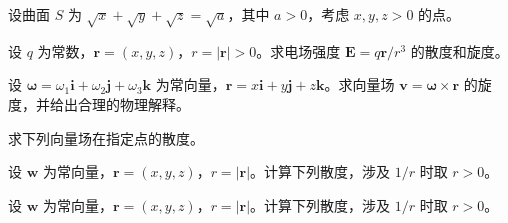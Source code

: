 \noindent\begin{minipage}{\textwidth}
设曲面 $S$ 为 $\sqrt x+\sqrt y+\sqrt z=\sqrt a$，其中 $a>0$，考虑 $x,y,z>0$ 的点。
\end{minipage}\par\vfill
\noindent\begin{minipage}{\textwidth}
设 $q$ 为常数，$\boldsymbol r=(x,y,z)$，$r=|\boldsymbol r|>0$。求电场强度 $\boldsymbol E=q\boldsymbol r/r^3$ 的散度和旋度。
\end{minipage}\par\vfill
\newpage
\noindent\begin{minipage}{\textwidth}
设 $\boldsymbol\omega=\omega_1\boldsymbol i+\omega_2\boldsymbol j+\omega_3\boldsymbol k$ 为常向量，$\boldsymbol r=x\boldsymbol i+y\boldsymbol j+z\boldsymbol k$。求向量场 $\boldsymbol v=\boldsymbol\omega\times\boldsymbol r$ 的旋度，并给出合理的物理解释。
\end{minipage}\par\vfill
\noindent\begin{minipage}{\textwidth}
求下列向量场在指定点的散度。
\end{minipage}\par\vfill
\noindent\begin{minipage}{\textwidth}
设 $\boldsymbol w$ 为常向量，$\boldsymbol r=(x,y,z)$，$r=|\boldsymbol r|$。计算下列散度，涉及 $1/r$ 时取 $r>0$。
\end{minipage}\par\vfill
\noindent\begin{minipage}{\textwidth}
设 $\boldsymbol w$ 为常向量，$\boldsymbol r=(x,y,z)$，$r=|\boldsymbol r|$。计算下列散度，涉及 $1/r$ 时取 $r>0$。
\end{minipage}\par\vfill
\newpage
